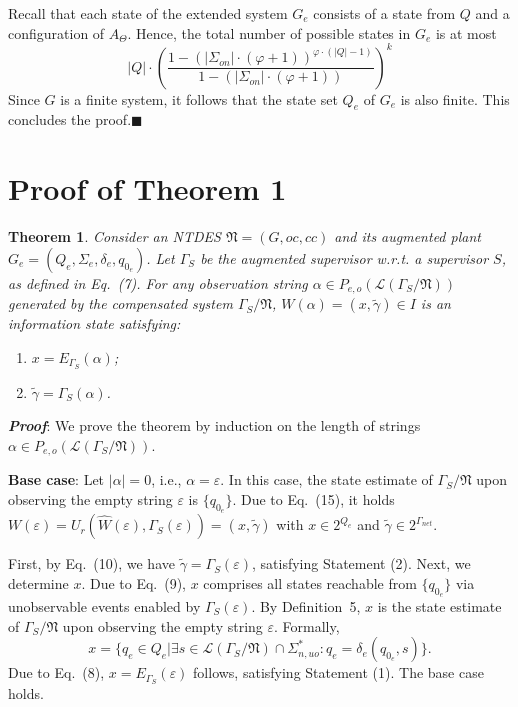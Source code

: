 \documentclass[journal,twocolumn,web]{IEEEtran}
\newtheorem{theorem}{Theorem}
\begin{document}
		Recall that each state of the extended system $G_e$ consists of a state from $Q$ and a configuration of $A_{\Theta}$. Hence, the total number of possible states in $G_e$ is at most  
		\begin{equation*}  
			|Q| \cdot \left( \frac{1 - (|\Sigma_{on}| \cdot (\varphi + 1))^{\varphi \cdot (|Q|-1)}}{1 - (|\Sigma_{on}| \cdot (\varphi + 1))} \right)^k  
		\end{equation*}  
		Since $G$ is a finite system, it follows that the state set $Q_e$ of $G_e$ is also finite. This concludes the proof.\hfill$\blacksquare$
	
	
	

	 	
	 	
	 		\section{Proof of Theorem 1}
	 
	 	\begin{theorem}\label{T2}  
	 		Consider an NTDES $\mathfrak{N}=(G,oc,cc)$ and its augmented plant $G_e=(Q_e, \Sigma_e, \delta_e,q_{0_e})$. Let $\Gamma_S$ be the augmented supervisor w.r.t. a supervisor $S$, as defined in Eq.~(7). For any observation string $\alpha\in P_{e,o}(\mathcal{L}(\Gamma_S/\mathfrak{N}))$ generated by the compensated system $\Gamma_S/\mathfrak{N}$, $W(\alpha)=(x,\tilde{\gamma})\in I$ is an information state satisfying:  
	 		
	 		\begin{enumerate}  
	 			\item $x=E_{\Gamma_S}(\alpha)$;  
	 			\item $\tilde{\gamma}=\Gamma_S(\alpha)$.  
	 		\end{enumerate}  
	 	\end{theorem}  
	 	
	 	\textbf{\emph{Proof}}:
	 		We prove the theorem by induction on the length of strings $\alpha\in P_{e,o}(\mathcal{L}(\Gamma_S/\mathfrak{N}))$.  
	 		
	 		\textbf{Base case}: Let $|\alpha|=0$, i.e., $\alpha=\varepsilon$. In this case, the state estimate of $\Gamma_S/\mathfrak{N}$ upon observing the empty string $\varepsilon$ is $\{q_{0_{e}}\}$. Due to Eq.~(15), it holds $W(\varepsilon)=U_r(\hat{W}(\varepsilon),\Gamma_S(\varepsilon))=(x,\tilde{\gamma})$ with $x\in 2^{Q_e}$ and $\tilde{\gamma}\in 2^{\Gamma_{net}}$.   
	 		
	 		First, by Eq.~(10), we have $\tilde{\gamma}=\Gamma_S(\varepsilon)$, satisfying Statement (2). Next, we determine $x$. Due to Eq.~(9), $x$ comprises all states reachable from $\{q_{0_{e}}\}$ via unobservable events enabled by $\Gamma_S(\varepsilon)$. By Definition~5, $x$ is the state estimate of $\Gamma_S/\mathfrak{N}$ upon observing the empty string $\varepsilon$. Formally,
	 		\[    
	 		x=\{q_e\in Q_e|\exists s\in \mathcal{L}(\Gamma_S/\mathfrak{N})\cap\Sigma_{n,uo}^*:q_e=\delta_e(q_{0_e},s)\}.  
	 		\]  
	 		Due to Eq.~(8), $x=E_{\Gamma_S}(\varepsilon)$ follows, satisfying Statement (1). The base case holds.  
	 		
\end{document}
